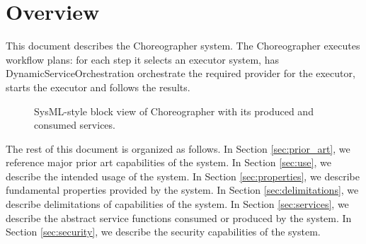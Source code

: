 \documentclass[a4paper]{arrowhead}
\begin{document}
\section{Overview}
\label{sec:overview}

This document describes the Choreographer system. The Choreographer executes workflow plans: for each step it selects an executor system, has Dynamic\allowbreak{}Service\allowbreak{}Orchestration orchestrate the required provider for the executor, starts the executor and follows the results.

\begin{figure}[ht!]
  \centering
  \caption{SysML-style block view of Choreographer with its produced and consumed services.}
  \label{fig:system}
\end{figure}

The rest of this document is organized as follows.
In Section \ref{sec:prior_art}, we reference major prior art capabilities of the system.
In Section \ref{sec:use}, we describe the intended usage of the system.
In Section \ref{sec:properties}, we describe fundamental properties provided by the system.
In Section \ref{sec:delimitations}, we describe delimitations of capabilities of the system.
In Section \ref{sec:services}, we describe the abstract service functions consumed or produced by the system.
In Section \ref{sec:security}, we describe the security capabilities of the system.
\end{document}
